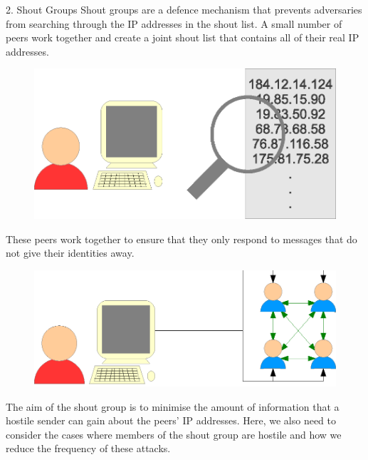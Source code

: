 \documentclass[ %
                    author={Luke Murray},
                supervisor={Dr. Simon Hollis},
                     title={Shadow Peer-to-Peer Networks},
                  subtitle={},
                    degree={MEng},
                      year={2013} ]{poster}
\begin{document}
\begin{frame}{}
\begin{columns}[t]
    \begin{column}{0.422\linewidth}
    \begin{block}{\normalsize 2. Shout Groups}
    \small Shout groups are a defence mechanism that prevents adversaries from searching through the IP addresses in the shout list. A small number of peers work together and create a joint shout list that contains all of their real IP addresses.
    \begin{figure}[h]
        \includegraphics{diagrams/poster_search_list.eps}
    \end{figure}
    These peers work together to ensure that they only respond to messages that do not give their identities away.
    \begin{figure}[h]
        \includegraphics{diagrams/poster_d3.eps}
    \end{figure}
    The aim of the shout group is to minimise the amount of information that a hostile sender can gain about the peers' IP addresses. Here, we also need to consider the cases where members of the shout group are hostile and how we reduce the frequency of these attacks.
    \end{block}
    \end{column}
\end{columns}

\vfill


\end{frame}
\end{document}
